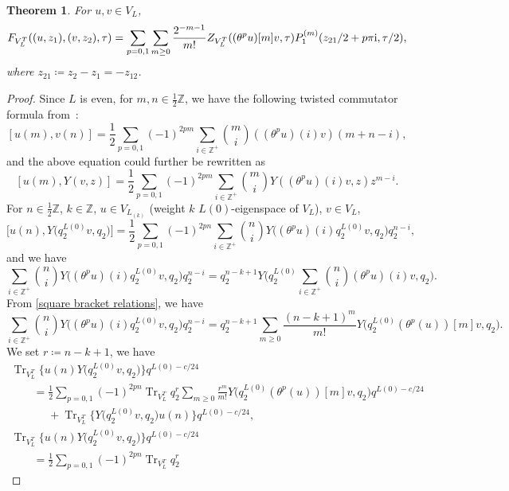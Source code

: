 \documentclass[pdftex]{sigma}
\numberwithin{equation}{section}
\newtheorem{Theorem}{Theorem}[section]
\theoremstyle{definition}
\begin{document}
\begin{Theorem}\label{Reduction Theorem}
For $u,v\in V_L$,
\[%
F_{V_L^T}((u,z_1),(v,z_2),\tau)=\sum_{p=0,1}\sum_{m\geq 0}\frac{2^{-m-1}}{m!}Z_{V_L^T}((\theta^pu)[m]v, \tau)P_1^{(m)}(z_{21}/2+p\pi {\rm i},\tau/2),
 \]
 where $z_{21}\coloneqq z_2-z_1=-z_{12}$.
\end{Theorem}

\begin{proof}
Since $L$ is even, for $m,n\in \frac{1}{2}\mathbb{Z}$, we have the following twisted commutator formula from~\cite{Frenkel1988VertexMonster}:
\[[u(m),v(n)]=\frac{1}{2}\sum_{p=0,1}(-1)^{2pm}\sum_{i\in \mathbb{Z}^+}\binom{m}{i}((\theta^pu)(i)v)(m+n-i),\]
and the above equation could further be rewritten as
\[[u(m),Y(v,z)]=\frac{1}{2}\sum_{p=0,1}(-1)^{2pm}\sum_{i\in \mathbb{Z}^+}\binom{m}{i}Y((\theta^pu)(i)v,z)z^{m-i}.\]
For $n\in \frac{1}{2}\mathbb{Z}$, $k\in \mathbb{Z}$, $u\in V_{L_{(k)}}$ (weight $k$ $L(0)$-eigenspace of $V_L$), $v\in V_L$,
\begin{equation}\label{Commutator Formula}
 \big[u(n),Y\bigl(q_2^{L(0)}v, q_2\bigr)\big]=\frac{1}{2}\sum_{p=0,1}(-1)^{2pn}\sum_{i\in \mathbb{Z}^+}\binom{n}{i}Y\bigl((\theta^pu)(i)q_2^{L(0)}v,q_2\bigr)q_2^{n-i},
\end{equation}
and we have
\[\sum_{i\in \mathbb{Z}^+}\binom{n}{i}Y\bigl((\theta^pu)(i)q_2^{L(0)}v,q_2\bigr)q_2^{n-i}=q_2^{n-k+1}Y\biggl(q_2^{L(0)}\sum_{i\in \mathbb{Z}^+}\binom{n}{i}(\theta^pu)(i)v,q_2\biggr).\]
From \eqref{square bracket relations}, we have
\[\sum_{i\in \mathbb{Z}^+}\binom{n}{i}Y\bigl((\theta^pu)(i)q_2^{L(0)}v,q_2\bigr)q_2^{n-i}=q_2^{n-k+1}\sum_{m\geq 0}\frac{(n-k+1)^m}{m!}Y\bigl(q_2^{L(0)} (\theta^p(u))[m]v, q_2\bigr).\]
We set $r\coloneqq n-k+1$, we have
\begin{gather}
\operatorname{Tr}_{V_L^T} \bigl\{ u(n)Y\bigl(q_2^{L(0)}v, q_2\bigr)\bigr\} q^{L(0)-c/24}
\nonumber\\
\qquad= \frac{1}{2} \sum_{p=0,1} (-1)^{2pn}
 \operatorname{Tr}_{V_L^T} q_2^r
 \sum_{m \ge 0} \frac{r^m}{m!}
 Y\bigl(q_2^{L(0)}(\theta^p(u))[m]v, q_2\bigr)
 q^{L(0)-c/24} \nonumber \\
\phantom{\qquad=}{} + \operatorname{Tr}_{V_L^T}
 \bigl\{ Y\bigl(q_2^{L(0)}v, q_2\bigr) u(n) \bigr\}
 q^{L(0)-c/24},
\nonumber
\\
\operatorname{Tr}_{V_L^T} \bigl\{ u(n)Y\bigl(q_2^{L(0)}v, q_2\bigr)\bigr\} q^{L(0)-c/24}\nonumber
\\
\qquad= \frac{1}{2} \sum_{p=0,1} (-1)^{2pn}
 \operatorname{Tr}_{V_L^T} q_2^r

\end{gather}
\end{proof}
\end{document}
